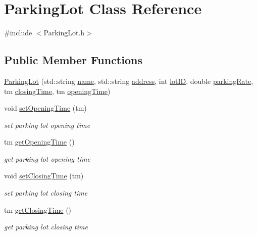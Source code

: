 \hypertarget{class_parking_lot}{}\section{Parking\+Lot Class Reference}
\label{class_parking_lot}


{\ttfamily \#include $<$Parking\+Lot.\+h$>$}

\subsection*{Public Member Functions}
\begin{DoxyCompactItemize}
\item 
\mbox{\hyperlink{class_parking_lot_af06c47fd4a50e7b2215cf2867876cc0c}{Parking\+Lot}} (std\+::string \mbox{\hyperlink{class_parking_lot_aaef3c99a2d6e7398325db451183c9cae}{name}}, std\+::string \mbox{\hyperlink{class_parking_lot_a0a2cd92fd4fb8e78530613df950a44bb}{address}}, int \mbox{\hyperlink{class_parking_lot_aa8002685719766c66877ab35d4f80f17}{lot\+ID}}, double \mbox{\hyperlink{class_parking_lot_a1b80d2bddbd40ebe71d8b89a00410e03}{parking\+Rate}}, tm \mbox{\hyperlink{class_parking_lot_ae3607cdf93ec2858e0ce1214c950b255}{closing\+Time}}, tm \mbox{\hyperlink{class_parking_lot_af6162bf724fb438c5c703989ce0bd10a}{opening\+Time}})
\item 
void \mbox{\hyperlink{class_parking_lot_accb1a328bc13823a502e27d099e4d724}{set\+Opening\+Time}} (tm)
\begin{DoxyCompactList}\small\item\em set parking lot opening time \end{DoxyCompactList}\item 
tm \mbox{\hyperlink{class_parking_lot_a08f4debc52d08ef0050c81e18a5759e5}{get\+Opening\+Time}} ()
\begin{DoxyCompactList}\small\item\em get parking lot opening time \end{DoxyCompactList}\item 
void \mbox{\hyperlink{class_parking_lot_a1406d44ee8d0dcb0c192176d706b437c}{set\+Closing\+Time}} (tm)
\begin{DoxyCompactList}\small\item\em set parking lot closing time \end{DoxyCompactList}\item 
tm \mbox{\hyperlink{class_parking_lot_a645ab3d930184975d74814aea73cd684}{get\+Closing\+Time}} ()
\begin{DoxyCompactList}\small\item\em get parking lot closing time \end{DoxyCompactList}\item 

\end{DoxyCompactItemize}

